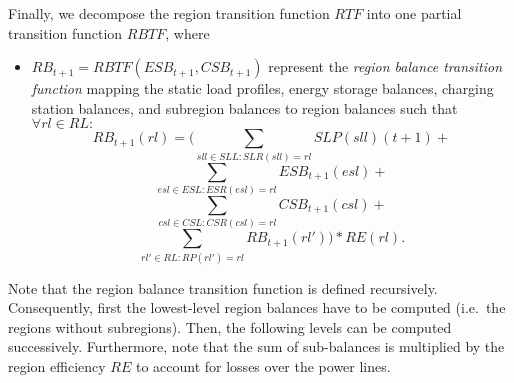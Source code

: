 Finally, we decompose the region transition function $RTF$ into one partial transition function $RBTF$, where
\begin{itemize}
	\item $RB_{t+1} = RBTF(ESB_{t+1}, CSB_{t+1})$ represent the \textit{region balance transition function} mapping the static load profiles, energy storage balances, charging station balances, and subregion balances to region balances such that $\forall rl \in RL:$
	\[
		RB_{t+1}(rl) = (\sum_{sll \in SLL: SLR(sll) = rl} SLP(sll)(t+1) +
	\]
	\[
		\sum_{esl \in ESL: ESR(esl) = rl} ESB_{t+1}(esl) +
	\]
	\[
		\sum_{csl \in CSL: CSR(csl) = rl} CSB_{t+1}(csl) +
	\]
	\[
		\sum_{rl' \in RL: RP(rl') = rl} RB_{t+1}(rl')) * RE(rl) \textrm{.}
	\]
\end{itemize}
Note that the region balance transition function is defined recursively. Consequently, first the lowest-level region balances have to be computed (i.e.\ the regions without subregions). Then, the following levels can be computed successively. Furthermore, note that the sum of sub-balances is multiplied by the region efficiency $RE$ to account for losses over the power lines.